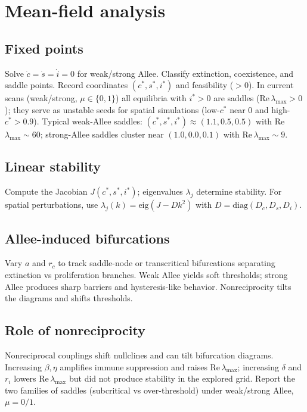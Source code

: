 \section{Mean-field analysis}

\subsection{Fixed points}
Solve $\dot{c}=\dot{s}=\dot{i}=0$ for weak/strong Allee. Classify extinction, coexistence, and saddle points. Record coordinates $(c^*,s^*,i^*)$ and feasibility ($>0$). In current scans (weak/strong, $\mu\in\{0,1\}$) all equilibria with $i^*>0$ are saddles (Re\,$\lambda_{\max}>0$); they serve as unstable seeds for spatial simulations (low-$c^*$ near 0 and high-$c^*>0.9$). Typical weak-Allee saddles: $(c^*,s^*,i^*)\approx(1.1,0.5,0.5)$ with Re\,$\lambda_{\max}\sim 60$; strong-Allee saddles cluster near $(1.0,0.0,0.1)$ with Re\,$\lambda_{\max}\sim 9$.

\subsection{Linear stability}
Compute the Jacobian $J(c^*,s^*,i^*)$; eigenvalues $\lambda_j$ determine stability. For spatial perturbations, use $\lambda_j(k)=\mathrm{eig}(J-Dk^2)$ with $D=\mathrm{diag}(D_c,D_s,D_i)$.

\subsection{Allee-induced bifurcations}
Vary $a$ and $r_c$ to track saddle-node or transcritical bifurcations separating extinction vs proliferation branches. Weak Allee yields soft thresholds; strong Allee produces sharp barriers and hysteresis-like behavior. Nonreciprocity tilts the diagrams and shifts thresholds.

\subsection{Role of nonreciprocity}
Nonreciprocal couplings shift nullclines and can tilt bifurcation diagrams. Increasing $\beta,\eta$ amplifies immune suppression and raises Re\,$\lambda_{\max}$; increasing $\delta$ and $r_i$ lowers Re\,$\lambda_{\max}$ but did not produce stability in the explored grid. Report the two families of saddles (subcritical vs over-threshold) under weak/strong Allee, $\mu=0/1$.

